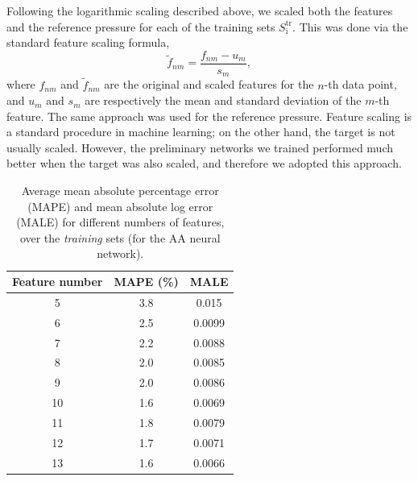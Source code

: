 \documentclass[%
 preprint,
 superscriptaddress,
 amsmath,amssymb,
longbibliography,
]{revtex4-2}
\begin{document}
Following the logarithmic scaling described above, we scaled both the features and the reference pressure for each of the training sets $S_\textrm{i}^\textrm{tr}$. This was done via the standard feature scaling formula,
\begin{equation}
    \tilde{f}_{nm} = \frac{f_{nm} - u_m}{s_m},
\end{equation}
where $f_{nm}$ and $\tilde{f}_{nm}$ are the original and scaled features for the $n$-th data point, and $u_m$ and $s_m$ are respectively the mean and standard deviation of the $m$-th feature. The same approach was used for the reference pressure. Feature scaling is a standard procedure in machine learning; on the other hand, the target is not usually scaled. However, the preliminary networks we trained performed much better when the target was also scaled, and therefore we adopted this approach.

\begin{table}[]
    \centering
    \begin{tabular}{ccc}
    \toprule
         Feature number & MAPE (\%) & MALE  \\
         \midrule
         5 & 3.8 & 0.015 \\
         6 & 2.5 & 0.0099 \\
         7 & 2.2 & 0.0088 \\
         8 & 2.0 & 0.0085 \\
         9 & 2.0 & 0.0086 \\
         10 & 1.6 & 0.0069 \\
         11 & 1.8 & 0.0079 \\
         12 & 1.7 & 0.0071 \\
         13 & 1.6 & 0.0066 \\\bottomrule
    \end{tabular}
    \caption{Average mean absolute percentage error (MAPE) and mean absolute log error (MALE) for different numbers of features, over the \emph{training} sets (for the AA neural network).}
    \label{tab:feature_errs}
\end{table}
\end{document}
